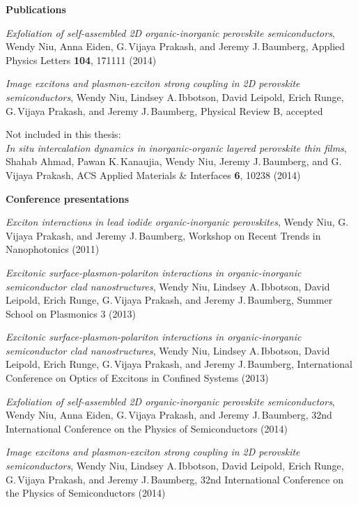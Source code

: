 \thispagestyle{empty}
\noindent \textbf{\Large Publications}

\vspace{8mm}

\noindent \textit{Exfoliation of self-assembled 2D organic-inorganic perovskite semiconductors}, Wendy Niu, Anna Eiden, G.\,Vijaya Prakash, and Jeremy J.\,Baumberg, Applied Physics Letters \textbf{104}, 171111 (2014)

\vspace{4mm}

\noindent \textit{Image excitons and plasmon-exciton strong coupling in 2D perovskite semiconductors}, Wendy Niu, Lindsey A.\,Ibbotson, David Leipold, Erich Runge, G.\,Vijaya Prakash, and Jeremy J.\,Baumberg, Physical Review B, accepted

\vspace{4mm}
\noindent Not included in this thesis:\\
\noindent \textit{In situ intercalation dynamics in inorganic-organic layered perovskite thin films}, Shahab Ahmad, Pawan K.\,Kanaujia, Wendy Niu, Jeremy J.\,Baumberg, and G.\,Vijaya Prakash, ACS Applied Materials \& Interfaces \textbf{6}, 10238 (2014)

\vfill

\noindent \textbf{\Large Conference presentations}

\vspace{8mm}
\noindent \textit{Exciton interactions in lead iodide organic-inorganic perovskites}, Wendy Niu, G.\,Vijaya Prakash, and Jeremy J.\,Baumberg, Workshop on Recent Trends in Nanophotonics (2011)

\vspace{4mm}

\noindent \textit{Excitonic surface-plasmon-polariton interactions in organic-inorganic semiconductor clad nanostructures}, Wendy Niu, Lindsey A.\,Ibbotson, David Leipold, Erich Runge, G.\,Vijaya Prakash, and Jeremy J.\,Baumberg, Summer School on Plasmonics 3 (2013)

\vspace{4mm}

\noindent \textit{Excitonic surface-plasmon-polariton interactions in organic-inorganic semiconductor clad nanostructures}, Wendy Niu, Lindsey A.\,Ibbotson, David Leipold, Erich Runge, G.\,Vijaya Prakash, and Jeremy J.\,Baumberg, International Conference on Optics of Excitons in Confined Systems (2013)

\vspace{4mm}

\noindent \textit{Exfoliation of self-assembled 2D organic-inorganic perovskite semiconductors}, Wendy Niu, Anna Eiden, G.\,Vijaya Prakash, and Jeremy J.\,Baumberg, 32nd International Conference on the Physics of Semiconductors (2014)

\vspace{4mm}

\noindent \textit{Image excitons and plasmon-exciton strong coupling in 2D perovskite semiconductors}, Wendy Niu, Lindsey A.\,Ibbotson, David Leipold, Erich Runge, G.\,Vijaya Prakash, and Jeremy J.\,Baumberg, 32nd International Conference on the Physics of Semiconductors (2014)